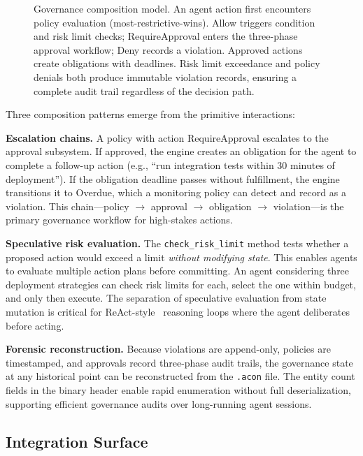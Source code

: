 \documentclass[10pt, twocolumn]{article}
\begin{document}
\begin{figure}[t]
\caption{Governance composition model. An agent action first encounters policy evaluation (most-restrictive-wins). Allow triggers condition and risk limit checks; RequireApproval enters the three-phase approval workflow; Deny records a violation. Approved actions create obligations with deadlines. Risk limit exceedance and policy denials both produce immutable violation records, ensuring a complete audit trail regardless of the decision path.}
\label{fig:composition}
\end{figure}

Three composition patterns emerge from the primitive interactions:

\textbf{Escalation chains.} A policy with action RequireApproval escalates to the approval subsystem. If approved, the engine creates an obligation for the agent to complete a follow-up action (e.g., ``run integration tests within 30 minutes of deployment''). If the obligation deadline passes without fulfillment, the engine transitions it to Overdue, which a monitoring policy can detect and record as a violation. This chain---policy $\to$ approval $\to$ obligation $\to$ violation---is the primary governance workflow for high-stakes actions.

\textbf{Speculative risk evaluation.} The \texttt{check\_risk\_limit} method tests whether a proposed action would exceed a limit \emph{without modifying state}. This enables agents to evaluate multiple action plans before committing. An agent considering three deployment strategies can check risk limits for each, select the one within budget, and only then execute. The separation of speculative evaluation from state mutation is critical for ReAct-style~\cite{react2022} reasoning loops where the agent deliberates before acting.

\textbf{Forensic reconstruction.} Because violations are append-only, policies are timestamped, and approvals record three-phase audit trails, the governance state at any historical point can be reconstructed from the \texttt{.acon} file. The entity count fields in the binary header enable rapid enumeration without full deserialization, supporting efficient governance audits over long-running agent sessions.

\subsection{Integration Surface}
\end{document}
